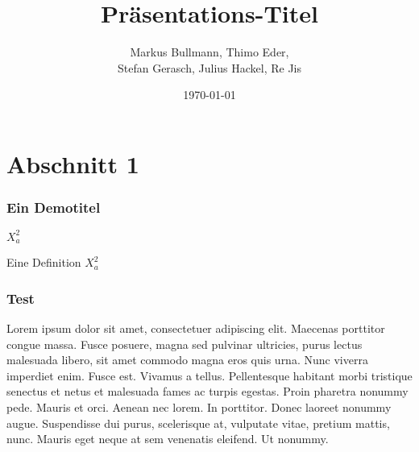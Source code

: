 \documentclass{beamer}
\title{Präsentations-Titel}
\author{Markus Bullmann, Thimo Eder, \\ Stefan Gerasch, Julius Hackel, Re Jis}
\date{\today}
\begin{document}
    \maketitle
    \frame{\tableofcontents[currentsection]}
    
    \section{Abschnitt 1}
    \begin{frame} %
        \frametitle{Ein Demotitel} %
        $X_a^2$
        \begin{Definition} %
            Eine Definition $X_a^2$
        \end{Definition}
    \end{frame}
    \begin{frame}
        \frametitle{Test}
        Lorem ipsum dolor sit amet, consectetuer adipiscing elit. Maecenas porttitor congue massa. Fusce posuere, magna sed pulvinar ultricies, purus lectus malesuada libero, sit amet commodo magna eros quis urna.
        Nunc viverra imperdiet enim. Fusce est. Vivamus a tellus.
        Pellentesque habitant morbi tristique senectus et netus et malesuada fames ac turpis egestas. Proin pharetra nonummy pede. Mauris et orci.
        Aenean nec lorem. In porttitor. Donec laoreet nonummy augue.
        Suspendisse dui purus, scelerisque at, vulputate vitae, pretium mattis, nunc. Mauris eget neque at sem venenatis eleifend. Ut nonummy.      
    \end{frame}
\end{document}
